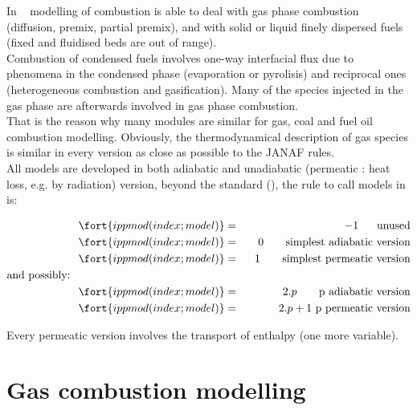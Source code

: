 In \CS~ modelling of combustion is able to deal with gas phase combustion
(diffusion, premix, partial premix), and with solid or liquid finely dispersed
fuels (fixed and fluidised beds are out of range).\\
Combustion of condensed fuels involves one-way interfacial flux due to phenomena
in the condensed phase (evaporation or pyrolisis) and reciprocal ones
(heterogeneous combustion and gasification). Many of the species injected in the
gas phase are afterwards involved in
gas phase combustion.\\
That is the reason why many modules are similar for gas, coal and fuel oil
combustion modelling. Obviously, the thermodynamical description of gas
species is similar in every version as close as possible to the JANAF rules.\\
All models are developed in both adiabatic and unadiabatic (permeatic : heat
loss, e.g. by radiation) version, beyond the standard (), the
rule to call models in  is:

\begin{eqnarray}
\fort{ippmod(index ; model)}  &=&     -1   ~~\quad \text{unused}                     \nonumber \\
\fort{ippmod(index ; model)}  &=& ~~   0  ~~~\quad \text{simplest adiabatic version} \nonumber \\
\fort{ippmod(index ; model)}  &=& ~~  1  ~~~\quad \text{simplest permeatic version}  \label{Eqs_00A}\\
\text{and possibly:}\qquad\qquad\qquad\qquad\qquad\qquad\qquad \nonumber & &\\
\fort{ippmod(index ; model)}  &=&  2.p    \qquad \text{p} ~\text{adiabatic version}  \nonumber \\
\fort{ippmod(index ; model)}  &=&  2.p+1 ~       \text{p} ~\text{permeatic version}  \nonumber
\end{eqnarray}


Every permeatic version involves the transport of enthalpy (one more variable).

\section*{Gas combustion modelling}

